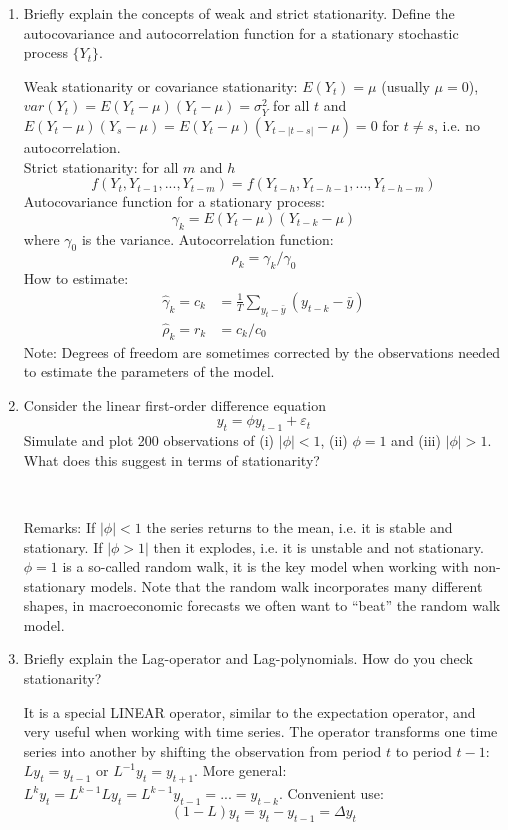 \begin{enumerate}
    \item Briefly explain the concepts of weak and strict stationarity. Define the autocovariance and autocorrelation function for a stationary stochastic process $\{Y_t\}$.
          \begin{solution}
              Weak stationarity or covariance stationarity: $E(Y_t)=\mu$ (usually $\mu=0$), $var(Y_t)=E(Y_t - \mu)(Y_t-\mu)=\sigma_Y^2$ for all $t$ and $E(Y_t-\mu)(Y_s-\mu)=E(Y_t-\mu)(Y_{t-|t-s|}-\mu)=0$ for $t\neq s$, i.e. no autocorrelation.\\
              Strict stationarity: for all $m$ and $h$ $$f(Y_t,Y_{t-1},...,Y_{t-m})=f(Y_{t-h},Y_{t-h-1},...,Y_{t-h-m})$$
              Autocovariance function for a stationary process: $$\gamma_k = E(Y_t - \mu)(Y_{t-k}-\mu)$$ where $\gamma_0$ is the variance. Autocorrelation function: $$\rho_k = \gamma_k/\gamma_0$$ How to estimate:
              \begin{align*}
                  \hat{\gamma}_k = c_k & = \frac{1}{T} \sum_{y_t -\bar{y}}(y_{t-k}-\bar{y}) \\
                  \hat{\rho}_k = r_k   & = c_k/c_0
              \end{align*}
              Note: Degrees of freedom are sometimes corrected by the observations needed to estimate the parameters of the model.
          \end{solution}

    \item Consider the linear first-order difference equation $$y_t=\phi y_{t-1}+\varepsilon_t$$ Simulate and plot 200 observations of (i) $|\phi|<1$, (ii) $\phi=1$ and (iii) $|\phi| >1$. What does this suggest in terms of stationarity?
          \begin{solution}~
              
              Remarks: If $|\phi|<1$ the series returns to the mean, i.e. it is stable and stationary. If $|\phi>1|$ then it explodes, i.e. it is unstable and not stationary. $\phi=1$ is a so-called random walk, it is the key model when working with non-stationary models. Note that the random walk incorporates many different shapes, in macroeconomic forecasts we often want to \enquote{beat} the random walk model.
          \end{solution}

    \item Briefly explain the Lag-operator and Lag-polynomials. How do you check stationarity?
          \begin{solution}
              It is a special LINEAR operator, similar to the expectation operator, and very useful when working with time series. The operator transforms one time series into another by shifting the observation from period $t$ to period $t-1$: $Ly_t = y_{t-1}$ or $L^{-1} y_t =y_{t+1}$. More general: $L^k y_t = L^{k-1} L y_t = L^{k-1} y_{t-1} = ... = y_{t-k}$. Convenient use:
              $$(1-L)y_t = y_t - y_{t-1}= \Delta y_t$$


\end{solution}
\end{enumerate}
